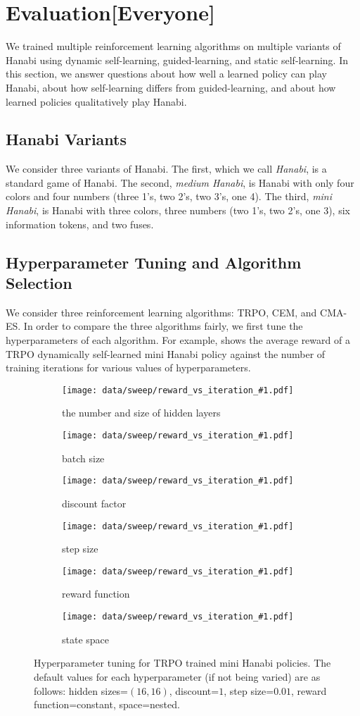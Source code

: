 \section{Evaluation[Everyone]}\label{sec:eval}

We trained multiple reinforcement learning algorithms on multiple variants of
Hanabi using dynamic self-learning, guided-learning, and static self-learning.
In this section, we answer questions about how well a learned policy can play
Hanabi, about how self-learning differs from guided-learning, and about how
learned policies qualitatively play Hanabi.

\subsection{Hanabi Variants}
We consider three variants of Hanabi. The first, which we call \emph{Hanabi},
is a standard game of Hanabi. The second, \emph{medium Hanabi}, is Hanabi with
only four colors and four numbers (three 1's, two 2's, two 3's, one 4). The
third, \emph{mini Hanabi}, is Hanabi with three colors, three numbers (two 1's,
two 2's, one 3), six information tokens, and two fuses.

\subsection{Hyperparameter Tuning and Algorithm Selection}
We consider three reinforcement learning algorithms: TRPO, CEM, and CMA-ES. In
order to compare the three algorithms fairly, we first tune the hyperparameters
of each algorithm. For example,  shows the average reward
of a TRPO dynamically self-learned mini Hanabi policy against the number of
training iterations for various values of hyperparameters.

\begin{figure}[ht]
  \newcommand{\hyperparamsubfig}[3]{%
    \begin{subfigure}[t]{0.32\textwidth}
      \centering
      \texttt{[image: data/sweep/reward\_vs\_iteration\_\#1.pdf]}
      \caption{#2}\label{fig:#3}
    \end{subfigure}
  }

  \centering

  \hyperparamsubfig{hidden_sizes}{the number and size of hidden layers}{}
  \hyperparamsubfig{batch_size}{batch size}{}
  \hyperparamsubfig{discount}{discount factor}{}

  \hyperparamsubfig{step_size}{step size}{}
  \hyperparamsubfig{reward}{reward function}{}
  \hyperparamsubfig{space}{state space}{}

  \caption{
    Hyperparameter tuning for TRPO trained mini Hanabi policies. The default
    values for each hyperparameter (if not being varied) are as follows: hidden
    sizes=$(16, 16)$, discount=$1$, step size=$0.01$, reward function=constant,
    space=nested.
  }\label{fig:trpo-tuning}
\end{figure}

